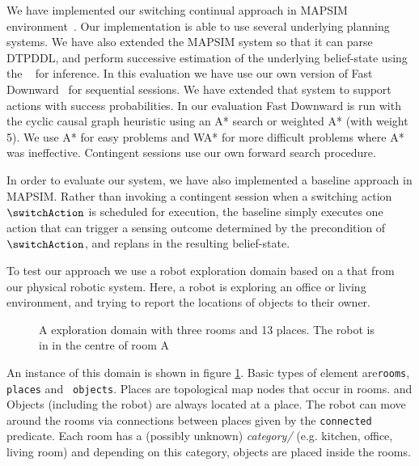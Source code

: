 

We have implemented our switching continual approach in MAPSIM
environment~\cite{brenner:nebel:jaamas09}. Our implementation is able
to use several underlying planning systems. We have also extended the
MAPSIM system so that it can parse DTPDDL, and perform successive
estimation of the underlying belief-state using the
~\cite{king:2009} for inference.  In this evaluation
we have use our own version of Fast Downward~\cite{fast-downward} for
sequential sessions. We have extended that system to support actions
with success probabilities. In our evaluation Fast Downward is run
with the cyclic causal graph heuristic using an A* search or weighted
A* (with weight 5). We use A* for easy problems and WA* for more
difficult problems where A* was ineffective. Contingent sessions use
our own forward search procedure. 



In order to evaluate our system, we have also implemented a baseline
approach in MAPSIM. Rather than invoking a contingent session when a
switching action $\switchAction$ is scheduled for execution, the
baseline simply executes one action that can trigger a sensing outcome
determined by the precondition of $\switchAction$, and replans in the
resulting belief-state.






To test our approach we use a robot exploration domain based on a that
from our physical robotic system. Here, a robot is exploring an office
or living environment, and trying to report the locations of objects
to their owner.

\begin{figure}[h]
  \centering
  
  \caption{A exploration domain with three rooms and 13 places. The
    robot is in in the centre of room A}
\label{fig:dora2}
\end{figure}
An instance of this domain is shown in figure \ref{fig:dora2}. Basic
types of element are{\tt rooms}, {\tt places} and {\tt
  objects}. Places are topological map nodes that occur in rooms. and
Objects (including the robot) are always located at a place. The robot
can move around the rooms via connections between places given by the
{\tt connected} predicate. Each room has a (possibly unknown) {\em
  category/} (e.g. kitchen, office, living room) and depending on this
category, objects are placed inside the rooms.

